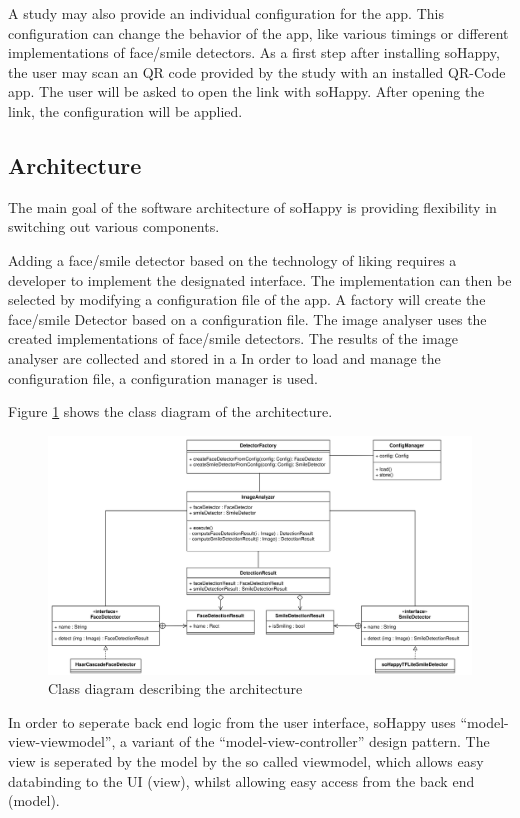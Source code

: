 A study may also provide an individual configuration for the app. This configuration
can change the behavior of the app, like various timings or different implementations
of face/smile detectors.
As a first step after installing soHappy, the user may scan an QR code provided
by the study with an installed QR-Code app. The user will be asked to open the
link with soHappy. After opening the link, the configuration will be applied.

\subsection{Architecture}

The main goal of the software architecture of soHappy is providing flexibility 
in switching out various components.

Adding a face/smile detector based on the technology of liking requires a
developer to implement the designated interface. The implementation can then be 
selected by modifying a configuration file of the app. A factory will create 
the face/smile Detector based on a configuration file. 
The image analyser uses the created implementations of face/smile
detectors. The results of the image analyser are collected and stored in a
In order to load and manage the configuration file, a configuration manager 
is used.

Figure \ref{fig:arch1} shows the class diagram of the architecture.

\begin{figure}
    \includegraphics[width=\linewidth]{figures/methodology_architecture_1.png}
    \caption{Class diagram describing the architecture}
    \label{fig:arch1}
\end{figure}

In order to seperate back end logic from the user interface, soHappy uses
``model-view-viewmodel'', a variant of the ``model-view-controller'' design 
pattern. The view is seperated by the model by the so called viewmodel, which
allows easy databinding to the UI (view), whilst allowing easy access from the
back end (model). \cite{mvvm}

